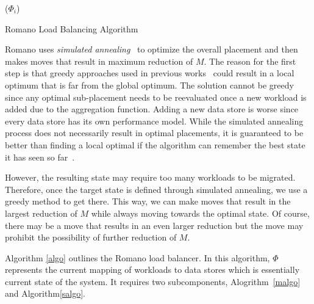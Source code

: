 \begin{algorithm}[!t]
\DontPrintSemicolon
{}
\loadBalance($\Phi_i$)
\caption{Romano Load Balancing Algorithm}\label{algo}
\end{algorithm}

Romano uses \emph{simulated annealing}~\cite{kirkpatrick:1983} to optimize the overall placement and then makes moves that result in maximum reduction of $M$.
The reason for the first step is that greedy approaches used in previous works~\cite{gulati:2010, gulati:2011, singh:2008} could result in a local optimum that is far from the global optimum.
The solution cannot be greedy since any optimal sub-placement needs to be reevaluated once a new workload is added due to the aggregation function.
Adding a new data store is worse since every data store has its own performance model.
While the simulated annealing process does not necessarily result in optimal placements, it is guaranteed to be better than finding a local optimal if the algorithm can remember the best state it has seen so far~\cite{granville:1994}.

However, the resulting state may require too many workloads to be migrated.
Therefore, once the target state is defined through simulated annealing, we use a greedy method to get there.
This way, we can make moves that result in the largest reduction of $M$ while always moving towards the optimal state.
Of course, there may be a move that results in an even larger reduction but the move may prohibit the possibility of further reduction of $M$.

Algorithm \ref{algo} outlines the Romano load balancer.
In this algorithm, $\Phi$ represents the current mapping of workloads to data stores which is essentially current state of the system.
It requires two subcomponents, Alogrithm~\ref{malgo} and Algorithm\ref{salgo}. 

